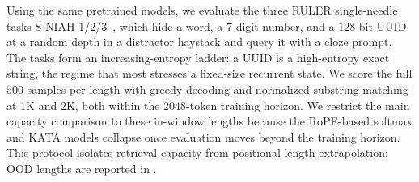 \documentclass{article}
\newcommand{\1}{\bm{1}}
\theoremstyle{definition}
\begin{document}
Using the same pretrained models, we evaluate the three RULER single-needle tasks
S-NIAH-1/2/3~\citep{hsieh24ruler}, which hide a word, a $7$-digit number, and a $128$-bit UUID at a
random depth in a distractor haystack and query it with a cloze prompt. The tasks form an
increasing-entropy ladder: a UUID is a high-entropy exact string, the regime that most stresses a
fixed-size recurrent state. We score the full $500$ samples per length with greedy decoding and
normalized substring matching at 1K and 2K, both within the $2048$-token training horizon. We
restrict the main capacity comparison to these in-window lengths because the RoPE-based softmax
and KATA models collapse once evaluation moves beyond the training horizon. This protocol isolates
retrieval capacity from positional length extrapolation; OOD lengths are reported in
.
\end{document}
